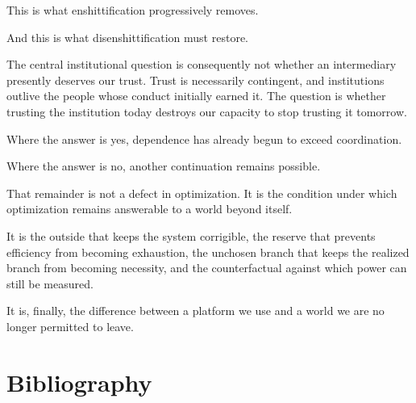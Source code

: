 \documentclass[11pt]{article}
\begin{document}
This is what enshittification progressively removes.

And this is what disenshittification must restore.

The central institutional question is consequently not whether an intermediary presently deserves our trust. Trust is necessarily contingent, and institutions outlive the people whose conduct initially earned it. The question is whether trusting the institution today destroys our capacity to stop trusting it tomorrow.

Where the answer is yes, dependence has already begun to exceed coordination.

Where the answer is no, another continuation remains possible.

That remainder is not a defect in optimization. It is the condition under which optimization remains answerable to a world beyond itself.

It is the outside that keeps the system corrigible, the reserve that prevents efficiency from becoming exhaustion, the unchosen branch that keeps the realized branch from becoming necessity, and the counterfactual against which power can still be measured.

It is, finally, the difference between a platform we use and a world we are no longer permitted to leave.

\clearpage
\section*{Bibliography}
\end{document}
